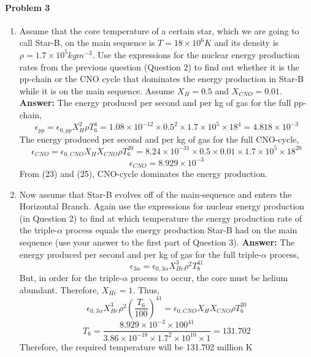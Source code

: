 \documentclass[11pt]{scrartcl}
\begin{document}
{\paragraph*{Problem 3}
\begin{enumerate}[label=(\alph*)]
\item Assume that the core temperature of a certain star, which we are going to call Star-B, on the main sequence is
$T = 18 \times 10^6 K$ and its density is $\rho = 1.7 \times 10^5 kg m^{-3}$. Use the expressions for the nuclear energy production
rates from the previous question (Question 2) to find out whether it is the pp-chain or the CNO cycle that dominates
the energy production in Star-B while it is on the main sequence. Assume $X_H = 0.5$ and $X_{CNO} = 0.01$.
\newline \textbf{Answer: }
\newline The energy produced per second and per kg of gas for the full pp-chain,
\begin{equation}
    \epsilon_{pp} = \epsilon_{0,pp}X^2_H\rho T^4_6 = 1.08 \times 10^{-12} \times 0.5^2 \times 1.7 \times 10^5 \times 18^4 = 4.818 \times 10^{-3}
\end{equation}
The energy produced per second and per kg of gas for the full CNO-cycle,
\begin{equation}
    \epsilon_{CNO} = \epsilon_{0,CNO}X_HX_{CNO}\rho T^{20}_6 = 8.24 \times 10^{-31} \times 0.5 \times 0.01 \times 1.7 \times 10^5 \times 18^{20}
\end{equation}
\begin{equation}
    \epsilon_{CNO} = 8.929 \times 10^{-3}
\end{equation}
From (23) and (25), CNO-cycle dominates the energy production.
\item  Now assume that Star-B evolves off of the main-sequence and enters the Horizontal Branch. Again use the
expressions for nuclear energy production (in Question 2) to find at which temperature the energy production rate
of the triple-$\alpha$ process equals the energy production Star-B had on the main sequence (use your answer to the first
part of Question 3).
\newline \textbf{Answer: }
\newline The energy produced per second and per kg of gas for the full triple-$\alpha$ process,
\begin{equation}
    \epsilon_{3\alpha} = \epsilon_{0,3\alpha}X^3_{He}\rho^2 T^{41}_8
\end{equation}
But, in order for the triple-$\alpha$ process to occur, the core must be helium abundant. Therefore, $X_{He} =1$. Thus, 
\begin{equation}
    \epsilon_{0,3\alpha}X^3_{He}\rho^2 (\frac{T_6}{100})^{41} = \epsilon_{0,CNO}X_HX_{CNO}\rho T^{20}_6 
\end{equation}
\begin{equation}
    T_6 = \frac{8.929 \times 10^ {-3} \times 100^{41}}{3.86 \times 10^{-18} \times 1.7^2 \times 10^{10} \times 1} = 131.702
\end{equation}
Therefore, the required temperature will be 131.702 million K
\end{enumerate}


}
\end{document}
